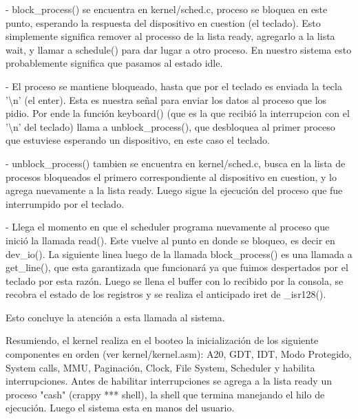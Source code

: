 - block\_process() se encuentra en kernel/sched.c, proceso se bloquea en este
punto, esperando la respuesta del dispositivo en cuestion (el teclado). Esto
simplemente significa remover al processo de la lista ready, agregarlo a la
lista wait, y llamar a schedule() para dar lugar a otro proceso. En nuestro
sistema esto probablemente significa que pasamos al estado idle.

- El proceso se mantiene bloqueado, hasta que por el teclado es enviada la
tecla '\textbackslash n' (el enter). Esta es nuestra señal para enviar los
datos al proceso que los pidio. Por ende la función keyboard() (que es la
que recibió la interrupcion con el '\textbackslash n' del teclado) llama a
unblock\_process(), que desbloquea al primer proceso que estuviese esperando
un dispositivo, en este caso el teclado.

- unblock\_process() tambien se encuentra en kernel/sched.c, busca en la lista
de procesos bloqueados el primero correspondiente al dispositivo en cuestion,
y lo agrega nuevamente a la lista ready. Luego sigue la ejecución del proceso
que fue interrumpido por el teclado.

- Llega el momento en que el scheduler programa nuevamente al proceso que
inició la llamada read(). Este vuelve al punto en donde se bloqueo, es decir en
dev\_io(). La siguiente linea luego de la llamada block\_process() es una
llamada a get\_line(), que esta garantizada que funcionará ya que fuimos
despertados por el teclado por esta razón. Luego se llena el buffer con lo
recibido por la consola, se recobra el estado de los registros y se realiza el
anticipado iret de \_isr128().

Esto concluye la atención a esta llamada al sistema.

Resumiendo, el kernel realiza en el booteo la inicialización de los siguiente
componentes en orden (ver kernel/kernel.asm): A20, GDT, IDT, Modo Protegido,
System calls, MMU, Paginación, Clock, File System, Scheduler y habilita
interrupciones. Antes de habilitar interrupciones se agrega a la lista ready un
proceso "cash" (crappy *** shell), la shell que termina manejando el hilo de
ejecución. Luego el sistema esta en manos del usuario.
